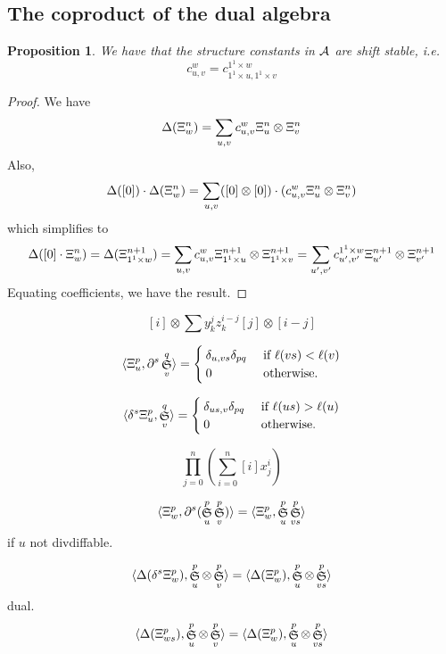 \documentclass{elsarticle}
\newtheorem{proposition}[lemma]{Proposition}
\theoremstyle{definition}
\theoremstyle{remark}
\numberwithin{equation}{subsection}
\DeclareMathOperator{\sch}{\mathfrak{S}}
\begin{document}
\subsection{The coproduct of the dual algebra}

\begin{proposition}
	We have that the structure constants in $\mathcal{A}$ are shift stable, i.e.
	$$c_{u,v}^w = c_{1^1\times u,1^1\times v}^{1^1\times w}$$
\end{proposition}
\begin{proof}
	We have
	$$\Delta(\Xi_w^n) = \sum_{u,v} c_{u,v}^w\Xi_u^n\otimes \Xi_v^n$$
	Also,
	$$\Delta([0])\cdot\Delta(\Xi_w^n) = \sum_{u,v} ([0]\otimes[0])\cdot (c_{u,v}^w\Xi_u^n\otimes \Xi_v^n)$$
	which simplifies to
	$$\Delta([0]\cdot\Xi_w^n) = \Delta(\Xi_{1^1\times w}^{n+1})=\sum_{u,v} c_{u,v}^w\Xi_{1^1\times u}^{n+1}\otimes \Xi_{1^1\times v}^{n+1}=\sum_{u',v'} c_{u',v'}^{1^1\times w}\Xi_{u'}^{n+1}\otimes \Xi_{v'}^{n+1}$$
	Equating coefficients, we have the result.
\end{proof}


	
	$$[i]\otimes \sum y_k^jz_k^{i-j}[j]\otimes [i-j]$$
	
	$$\langle \dsch_u^p,\partial^s\sch_v^q\rangle = \begin{cases}
		\delta_{u,vs}\delta_{pq}&\mbox{ if }\ell(vs)<\ell(v)\\
		0&\mbox{ otherwise.}
	\end{cases}$$
	
	$$\langle \delta^s\dsch_u^p,\sch_v^q\rangle = \begin{cases}
		\delta_{us,v}\delta_{pq}&\mbox{ if }\ell(us)>\ell(u)\\
		0&\mbox{ otherwise.}
	\end{cases}$$
	
	
	$$\prod_{j=0}^n\left(\sum_{i=0}^n [i]x_j^i\right)$$
	
	$$\langle \dsch_w^p,\partial^s(\sch_u^p\sch_v^p)\rangle = \langle \dsch_w^p,\sch_u^p\sch_{vs}^p\rangle$$
	if $u$ not divdiffable.
	
	$$\langle \Delta(\delta^s\dsch_w^p),\sch_u^p\otimes \sch_v^p\rangle = \langle \Delta(\dsch_w^p),\sch_u^p\otimes\sch_{vs}^p\rangle$$
	dual.
	$$\langle \Delta(\dsch_{ws}^p),\sch_u^p\otimes \sch_v^p\rangle = \langle \Delta(\dsch_w^p),\sch_u^p\otimes\sch_{vs}^p\rangle$$
	
\end{document}
